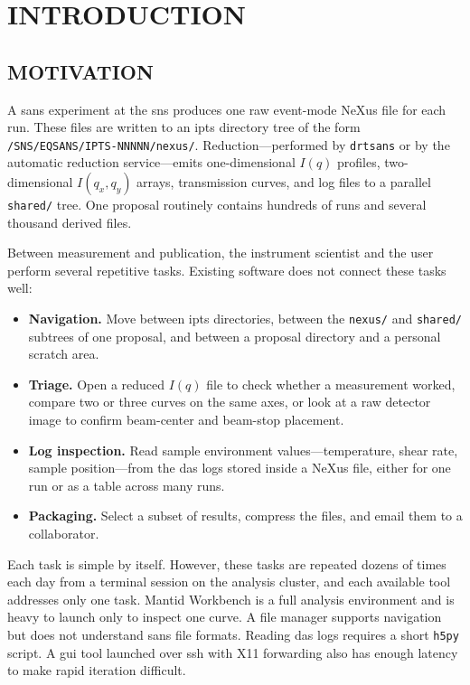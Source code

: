 \documentclass[tm]{ornltm}
\begin{document}
\acresetall
\section{INTRODUCTION}
\label{sec:intro}

\subsection{MOTIVATION}

A \ac{sans} experiment at the \ac{sns} produces one raw event-mode NeXus file
for each run. These files are written to an \ac{ipts} directory tree of the form
\texttt{/SNS/EQSANS/IPTS-NNNNN/nexus/}. Reduction---performed by
\texttt{drtsans} \autocite{drtsans} or by the automatic reduction service---emits
one-dimensional $I(q)$ profiles, two-dimensional $I(q_x,q_y)$ arrays,
transmission curves, and log files to a parallel \texttt{shared/} tree. One
proposal routinely contains hundreds of runs and several thousand derived
files.

Between measurement and publication, the instrument scientist and the user
perform several repetitive tasks. Existing software does not connect these
tasks well:

\begin{itemize}
  \item \textbf{Navigation.} Move between \ac{ipts} directories, between the
    \texttt{nexus/} and \texttt{shared/} subtrees of one proposal, and between a
    proposal directory and a personal scratch area.
  \item \textbf{Triage.} Open a reduced $I(q)$ file to check whether a
    measurement worked, compare two or three curves on the same axes, or look
    at a raw detector image to confirm beam-center and beam-stop
    placement.
  \item \textbf{Log inspection.} Read sample environment values---temperature,
    shear rate, sample position---from the \ac{das} logs stored inside a NeXus
    file, either for one run or as a table across many runs.
  \item \textbf{Packaging.} Select a subset of results, compress the files, and
    email them to a collaborator.
\end{itemize}

Each task is simple by itself. However, these tasks are repeated dozens of times
each day from a terminal session on the analysis cluster, and each available
tool addresses only one task. Mantid Workbench \autocite{mantid} is a full
analysis environment and is heavy to launch only to inspect one curve. A file
manager supports navigation but does not understand \ac{sans} file formats.
Reading \ac{das} logs requires a short \texttt{h5py} \autocite{h5py} script. A
\ac{gui} tool launched over \ac{ssh} with X11 forwarding also has enough latency
to make rapid iteration difficult.
\end{document}
